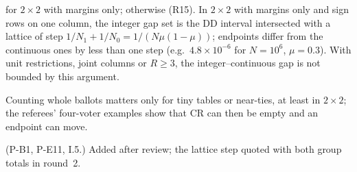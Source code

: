 \begin{result}\label{res:m21}
 for $2\times2$ with margins only;  otherwise (R15).
In $2\times2$ with margins only and sign rows on one column, the integer gap set
is the DD interval intersected with a lattice of step $1/N_1+1/N_0=1/(N\mu(1-\mu))$;
endpoints differ from the continuous ones by less than one step (e.g.\
$4.8\times10^{-6}$ for $N=10^6$, $\mu=0.3$). With unit restrictions, joint
columns or $R\ge3$, the integer--continuous gap is not bounded by this argument.
\end{result}
\begin{plain}
Counting whole ballots matters only for tiny tables or near-ties, at least in
$2\times2$; the referees' four-voter examples show that CR can then be empty and
an endpoint can move.
\end{plain}
\begin{revnote}(P-B1, P-E11, I.5.) Added after review; the lattice step quoted with both group totals in round~2.\end{revnote}

